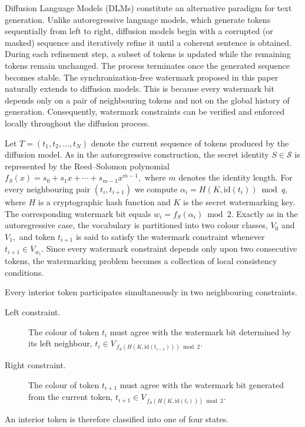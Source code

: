 \documentclass[a4paper,11pt]{llncs}
\begin{document}
Diffusion Language Models (DLMs) constitute an alternative paradigm for
text generation. Unlike autoregressive language models, which generate
tokens sequentially from left to right, diffusion models begin with a
corrupted (or masked) sequence and iteratively refine it until a coherent
sentence is obtained. During each refinement step, a subset of tokens is
updated while the remaining tokens remain unchanged. The process
terminates once the generated sequence becomes stable.
%
The synchronization-free watermark proposed in this paper naturally
extends to diffusion models. This is because every watermark bit depends
only on a pair of neighbouring tokens and not on the global history of
generation. Consequently, watermark constraints can be verified and
enforced locally throughout the diffusion process.

Let
$
T=(t_1,t_2,\ldots,t_N)
$
denote the current sequence of tokens produced by the diffusion model.
As in the autoregressive construction, the secret identity
$
S\in\mathcal S
$
is represented by the Reed--Solomon polynomial
$
f_S(x)=
s_0+s_1x+\cdots+s_{m-1}x^{m-1},
$
where $m$ denotes the identity length.
For every neighbouring pair $(t_i,t_{i+1})$ we compute
$
\alpha_i
=
H(K,\mathrm{id}(t_i))
\bmod q,
$
where $H$ is a cryptographic hash function and $K$ is the secret
watermarking key.
The corresponding watermark bit equals
$
w_i
=
f_S(\alpha_i)\bmod2.
$
Exactly as in the autoregressive case, the vocabulary is partitioned into
two colour classes,
$V_0$
and
$V_1,$
and token $t_{i+1}$ is said to satisfy the watermark constraint whenever
$
t_{i+1}\in V_{w_i}.
$
Since every watermark constraint depends only upon two consecutive tokens,
the watermarking problem becomes a collection of local consistency
conditions.


Every interior token participates simultaneously in two neighbouring
constraints.
%
\begin{description}
\item[\rm Left constraint.]
The colour of token $t_i$ must agree with the watermark bit determined by
its left neighbour,
$
t_i
\in
V_{\,f_S(H(K,\mathrm{id}(t_{i-1})))\bmod2}.
$
\item[\rm Right constraint.]
The colour of token $t_{i+1}$ must agree with the watermark bit generated
from the current token,
$
t_{i+1}
\in
V_{\,f_S(H(K,\mathrm{id}(t_i)))\bmod2}.
$
\end{description}
%
An interior token is therefore classified into one of four states.
\end{document}
